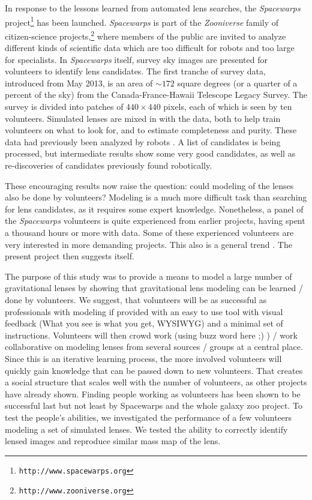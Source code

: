 \documentclass[12pt,preprint]{aastex}
\newcommand{\sw}{Spacewarps\xspace}
\newcommand{\needcite}[1][]{\todo[green]{cit #1}}
\begin{document}
In response to the lessons learned from automated lens searches, the
{\em Spacewarps\/} project\footnote{\tt http://www.spacewarps.org}
 has been launched.  {\em Spacewarps\/} is
part of the {\em Zooniverse\/} family of citizen-science
projects,\footnote{\tt http://www.zooniverse.org} where members of the
public are invited to analyze different kinds of scientific data which
are too difficult for robots and too large for specialists.  In {\em
 Spacewarps\/} itself, survey sky images are presented for volunteers to identify lens candidates.  The first tranche of survey data, introduced from May 2013, is an area of $\sim172$ square
degrees (or a quarter of a percent of the sky) from the Canada-France-Hawaii Telescope Legacy Survey.
 The survey is divided into patches of $440\times 440$ pixels, each of
which is seen by ten volunteers.  Simulated lenses are mixed in with
the data, both to help train volunteers on what to look for, and to
estimate completeness and purity.
These data had previously been analyzed by robots \cite{Gavazzi2012, More2012ApJ}.  
  A list of candidates is being
processed, but intermediate results show some very good candidates, as
well as re-discoveries of candidates previously found robotically.

These encouraging results now raise the question: could modeling of
the lenses also be done by volunteers?  Modeling is a much more
difficult task than searching for lens candidates, as it requires some
expert knowledge.  Nonetheless, a panel of the {\em Spacewarps\/}
volunteers is quite experienced from earlier projects, having spent a
thousand hours or more with data.  Some of these experienced
volunteers are very interested in more demanding projects.  This also
is a general trend \citep[cf.][]{Khatib22112011}.  The present project
then suggests itself.

The purpose of this study was to provide a means to model a large number of gravitational lenses by showing that gravitational lens modeling can be learned / done by volunteers.
We suggest, that volunteers will be as successful as professionals with modeling if provided with an easy to use tool with visual feedback (What you see is what you get, WYSIWYG) and a minimal set of instructions.
Volunteers will then crowd work (using buzz word here ;) ) / work collaborative on modeling lenses from several sources / groups at a central place.
Since this is an iterative learning process, the more involved volunteers will quickly gain knowledge that can be passed down to new volunteers.
That creates a social structure that scales well with the number of volunteers, as other projects have already shown. %
Finding people working as volunteers has been shown to be successful last but not least by \sw and the whole galaxy zoo project.
To test the people's abilities, we investigated the performance of a few volunteers modeling a set of simulated lenses.
We tested the ability to correctly identify lensed images and reproduce similar mass map of the lens.
\end{document}
